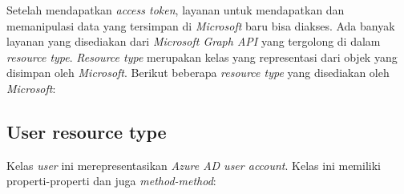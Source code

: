 Setelah mendapatkan \textit{access token}, layanan untuk mendapatkan dan memanipulasi data yang tersimpan di \textit{Microsoft} baru bisa diakses. Ada banyak layanan yang disediakan dari \textit{Microsoft Graph API} yang tergolong di dalam \textit{resource type}. \textit{Resource type} merupakan kelas yang representasi dari objek yang disimpan oleh \textit{Microsoft}. Berikut beberapa \textit{resource type} yang disediakan oleh \textit{Microsoft}:

\subsection{User resource type}
Kelas \textit{user} ini merepresentasikan \textit{Azure AD user account}. Kelas ini memiliki properti-properti dan juga \textit{method-method}:

